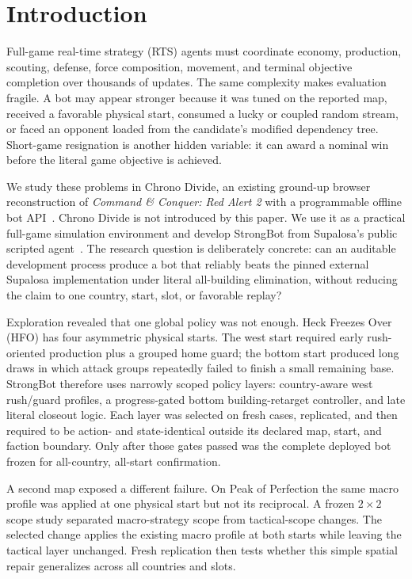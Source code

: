 \section{Introduction}
\label{sec:introduction}

Full-game real-time strategy (RTS) agents must coordinate economy, production,
scouting, defense, force composition, movement, and terminal objective
completion over thousands of updates. The same complexity makes evaluation
fragile. A bot may appear stronger because it was tuned on the reported map,
received a favorable physical start, consumed a lucky or coupled random stream,
or faced an opponent loaded from the candidate's modified dependency tree.
Short-game resignation is another hidden variable: it can award a nominal win
before the literal game objective is achieved.

We study these problems in Chrono Divide, an existing ground-up browser
reconstruction of \emph{Command \& Conquer: Red Alert 2} with a programmable
offline bot API~\cite{chronodivide2026,chronodivideGameApi2026}. Chrono Divide
is not introduced by this paper. We use it as a practical full-game simulation
environment and develop StrongBot from Supalosa's public scripted
agent~\cite{supalosa2026bot}. The research question is deliberately concrete:
can an auditable development process produce a bot that reliably beats the
pinned external Supalosa implementation under literal all-building elimination,
without reducing the claim to one country, start, slot, or favorable replay?

Exploration revealed that one global policy was not enough. Heck Freezes Over
(HFO) has four asymmetric physical starts. The west start required early
rush-oriented production plus a grouped home guard; the bottom start produced
long draws in which attack groups repeatedly failed to finish a small remaining
base. StrongBot therefore uses narrowly scoped policy layers: country-aware west
rush/guard profiles, a progress-gated bottom building-retarget controller, and
late literal closeout logic. Each layer was selected on fresh cases, replicated,
and then required to be action- and state-identical outside its declared map,
start, and faction boundary. Only after those gates passed was the complete
deployed bot frozen for all-country, all-start confirmation.

A second map exposed a different failure. On Peak of Perfection the same macro
profile was applied at one physical start but not its reciprocal. A frozen
$2\times2$ scope study separated macro-strategy scope from tactical-scope
changes. The selected change applies the existing macro profile at both starts
while leaving the tactical layer unchanged. Fresh replication then tests
whether this simple spatial repair generalizes across all countries and slots.

